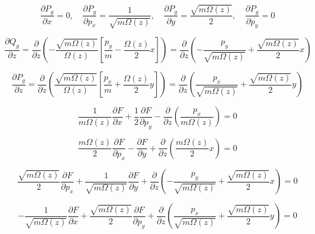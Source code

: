 \begin{equation*}
    \frac{\partial P_g}{\partial x}=0,\quad \frac{\partial P_g}{\partial p_x}=\frac{1}{\sqrt{m\Omega(z)}},\quad \frac{\partial P_g}{\partial y}=\frac{\sqrt{m\Omega(z)}}{2},\quad \frac{\partial P_g}{\partial p_y}=0
\end{equation*}

\begin{equation*}
    \frac{\partial Q_g}{\partial z}=\frac{\partial}{\partial z}\left(-\frac{\sqrt{m\Omega(z)}}{\Omega(z)}\left[\frac{p_y}{m}-\frac{\Omega(z)}{2}x\right]\right)=\frac{\partial}{\partial z}\left(-\frac{p_y}{\sqrt{m\Omega(z)}}+\frac{\sqrt{m\Omega(z)}}{2}x\right)
\end{equation*}

\begin{equation*}
    \frac{\partial P_g}{\partial z}=\frac{\partial}{\partial z}\left(\frac{\sqrt{m\Omega(z)}}{\Omega(z)}\left[\frac{p_x}{m}+\frac{\Omega(z)}{2}y\right]\right)=\frac{\partial}{\partial z}\left(\frac{p_x}{\sqrt{m\Omega(z)}}+\frac{\sqrt{m\Omega(z)}}{2}y\right)
\end{equation*}

\begin{equation}
    \label{H-49-2}
    \frac{1}{m\Omega(z)}\frac{\partial F}{\partial x}+\frac{1}{2}\frac{\partial F}{\partial p_y}-\frac{\partial}{\partial z}\left(\frac{p_x}{m\Omega(z)}\right)=0
\end{equation}

\begin{equation}
    \label{H-50-2}
    \frac{m\Omega(z)}{2}\frac{\partial F}{\partial p_x}-\frac{\partial F}{\partial y}+\frac{\partial}{\partial z}\left(\frac{m\Omega(z)}{2}x\right)=0
\end{equation}

\begin{equation}
    \label{H-51-2}
    \frac{\sqrt{m\Omega(z)}}{2}\frac{\partial F}{\partial p_x}+\frac{1}{\sqrt{m\Omega(z)}}\frac{\partial F}{\partial y}+\frac{\partial}{\partial z}\left(-\frac{p_y}{\sqrt{m\Omega(z)}}+\frac{\sqrt{m\Omega(z)}}{2}x\right)=0
\end{equation}

\begin{equation}
    \label{H-52-2}
    -\frac{1}{\sqrt{m\Omega(z)}}\frac{\partial F}{\partial x}+\frac{\sqrt{m\Omega(z)}}{2}\frac{\partial F}{\partial p_y}+\frac{\partial}{\partial z}\left(\frac{p_x}{\sqrt{m\Omega(z)}}+\frac{\sqrt{m\Omega(z)}}{2}y\right)=0
\end{equation}

